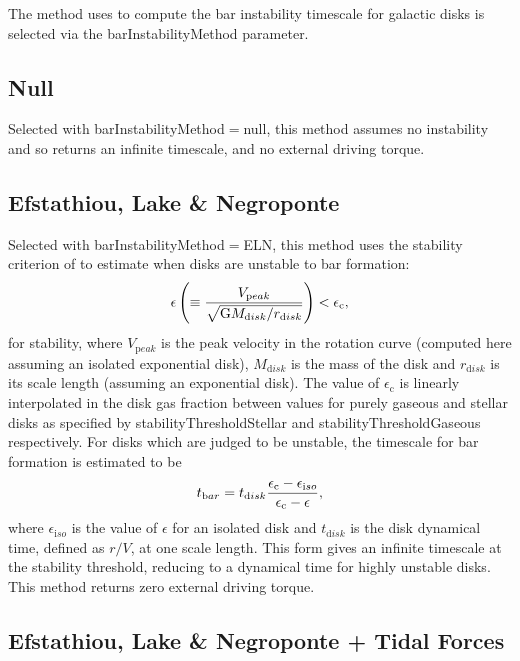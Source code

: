 The method uses to compute the bar instability timescale for galactic disks is selected via the {\normalfont \ttfamily barInstabilityMethod} parameter.

\subsection{Null}

Selected with {\normalfont \ttfamily barInstabilityMethod}$=${\normalfont \ttfamily null}, this method assumes no instability and so returns an infinite timescale, and no external driving torque.

\subsection{Efstathiou, Lake \& Negroponte}

Selected with {\normalfont \ttfamily barInstabilityMethod}$=${\normalfont \ttfamily ELN}, this method uses the stability criterion of \cite{efstathiou_stability_1982} to estimate when disks are unstable to bar formation:
\begin{equation}
 \epsilon \left( \equiv {V_{\mathrm peak} \over \sqrt{\G M_{\mathrm disk}/r_{\mathrm disk}}} \right) < \epsilon_{\mathrm c},
\end{equation}
for stability, where $V_{\mathrm peak}$ is the peak velocity in the rotation curve (computed here assuming an isolated exponential disk), $M_{\mathrm disk}$ is the mass of the disk and $r_{\mathrm disk}$ is its scale length (assuming an exponential disk). The value of $\epsilon_{\mathrm c}$ is linearly interpolated in the disk gas fraction between values for purely gaseous and stellar disks as specified by {\normalfont \ttfamily stabilityThresholdStellar} and {\normalfont \ttfamily stabilityThresholdGaseous} respectively. For disks which are judged to be unstable, the timescale for bar formation is estimated to be
\begin{equation}
 t_{\mathrm bar} = t_{\mathrm disk} {\epsilon_{\mathrm c} - \epsilon_{\mathrm iso} \over \epsilon_{\mathrm c} - \epsilon},
\end{equation}
where $\epsilon_{\mathrm iso}$ is the value of $\epsilon$ for an isolated disk and $t_{\mathrm disk}$ is the disk dynamical time, defined as $r/V$, at one scale length. This form gives an infinite timescale at the stability threshold, reducing to a dynamical time for highly unstable disks. This method returns zero external driving torque.

\subsection{Efstathiou, Lake \& Negroponte + Tidal Forces}

